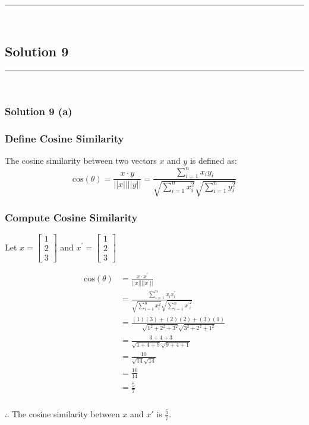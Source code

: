 \documentclass{article}
\begin{document}
\noindent\rule{\textwidth}{0.4pt}\\

\newpage

\subsection*{Solution 9}
\noindent\rule{\textwidth}{0.4pt}\\
\subsubsection*{Solution 9 (a)}
\subsubsection*{Define Cosine Similarity}
\parbox{\textwidth}{
  The cosine similarity between two vectors $x$ and $y$ is defined as:
  $$\text{cos}(\theta) = \frac{x \cdot y}{||x|| ||y||} = \frac{\sum_{i=1}^{n}x_{i}y_{i}}{\sqrt{\sum_{i=1}^{n}x_{i}^2}\sqrt{\sum_{i=1}^{n}y_{i}^2}}$$
}
\subsubsection*{Compute Cosine Similarity}
\parbox{\textwidth}{
  Let $x=\begin{bmatrix} 1 \\ 2 \\ 3 \end{bmatrix}$ and $x^{\prime}=\begin{bmatrix} 1 \\ 2 \\ 3 \end{bmatrix}$

}
\begin{align*}
    \text{cos}(\theta) &= \frac{x \cdot x^{\prime}}{||x|| ||x^{\prime}||} \\
    &= \frac{\sum_{i=1}^{n}x_{i}x^{\prime}_{i}}{\sqrt{\sum_{i=1}^{n}x_{i}^2}\sqrt{\sum_{i=1}^{n}{x^{\prime}}_{i}^2}} \\
    &= \frac{(1)(3) + (2)(2) + (3)(1)}{\sqrt{1^2+2^2+3^2} \sqrt{3^2+2^2+1^2}} \\
    &= \frac{3 + 4 + 3}{\sqrt{1+4+9} \sqrt{9+4+1}} \\
    &= \frac{10}{\sqrt{14} \sqrt{14}} \\
    &= \frac{10}{14} \\
    &= \frac{5}{7}
\end{align*}
\subsubsection*{\normalfont}{$\therefore$ The cosine similarity between $x$ and $x'$ is $\frac{5}{7}$.}
\end{document}
